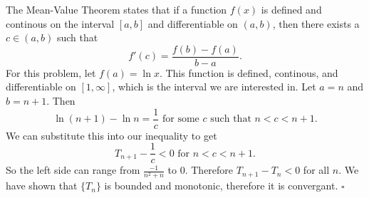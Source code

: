 \documentclass[12pt,letterpaper]{article}
\begin{document}
The Mean-Value Theorem states that if a function $f(x)$ is defined and continous on the interval $[a,b]$ and differentiable on $(a,b)$, then there exists a $c \in (a,b)$ such that
\[
f'(c)=\frac{f(b)-f(a)}{b-a}.
\]
For this problem, let $f(a)=\ln{x}$. This function is defined, continous, and differentiable on $[1,\infty ]$, which is the interval we are interested in. Let $a=n$ and $b=n+1$. Then 
\[
\ln{(n+1)}-\ln{n}=\frac{1}{c} \mbox{ for some } c \mbox{ such that } n<c<n+1.
\]
We can substitute this into our inequality to get
\[
T_{n+1}-\frac{1}{c} < 0 \mbox{ for } n<c<n+1.
\]
So the left side can range from $\frac{-1}{n^2+n}$ to 0. Therefore $T_{n+1}-T_n < 0$ for all $n$. We have shown that $\{T_n\}$ is bounded and monotonic, therefore it is convergant.
\hfill$\square$



\end{document}

